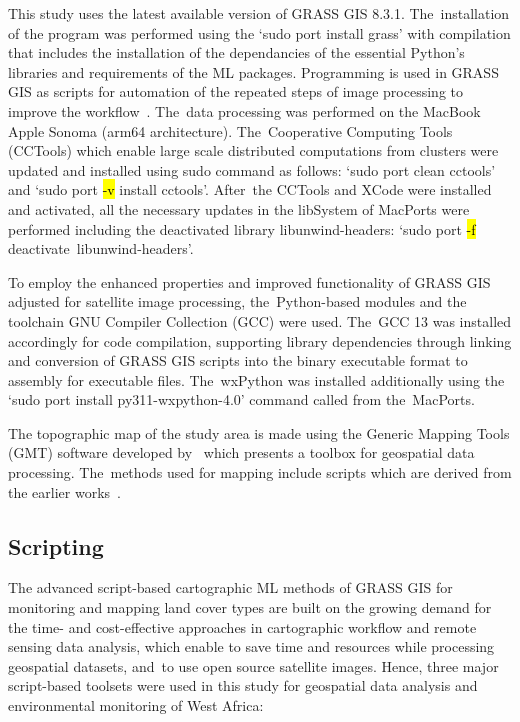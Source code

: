 \documentclass[coasts,article,accept,pdftex,oneauthor]{Definitions/mdpi}
\begin{document}
{This} study {uses} the latest available version of GRASS GIS 8.3.1. The~installation of the program was performed using {the} `sudo port install grass' with compilation {that includes }the {installation of the }dependancies {of} the essential Python's libraries and requirements of {the }ML packages. Programming is used in GRASS GIS as scripts for automation of the repeated steps of image processing {to improve} the workflow~\cite{technologies11020046,jmse11040871}. The~data processing was performed on the MacBook Apple Sonoma (arm64 {architecture}). The~Cooperative Computing Tools (CCTools) which enable large scale distributed computations from clusters were updated and installed using sudo {command} as follows: `sudo port clean cctools' and `sudo port \hl{-v} %
 install cctools'. After~the CCTools and XCode were installed and activated, {all the }necessary updates in the libSystem of MacPorts were performed including the deactivated library libunwind-headers: `sudo port \hl{-f} deactivate~libunwind-headers'. 

To employ the enhanced properties and improved functionality of GRASS GIS adjusted for satellite image processing,   the~Python-based modules and the toolchain GNU Compiler Collection (GCC) {were used}. The~GCC 13 was installed accordingly for code compilation, supporting library dependencies through linking and conversion of GRASS GIS scripts into the binary executable format to assembly for executable files. The~wxPython was installed additionally using the `sudo port install py311-wxpython-4.0' {command called} from the~MacPorts. 

The topographic map of the study area is made using the Generic Mapping Tools (GMT) software developed by~\cite{Wessel} {which presents a toolbox for geospatial data processing}. The~methods used for mapping {include} scripts {which }are derived from the earlier works~\cite{Lemenkova202217,Lemenkova202212,Lemenkova202203}. 

\subsection{Scripting}
The advanced script-based cartographic ML methods of GRASS GIS for monitoring and mapping land cover types are built on the growing demand for the time- and cost-effective approaches in cartographic workflow and remote sensing data analysis, which enable to save time and resources while processing geospatial datasets, and~{to }use open source satellite images. Hence, three major script-based toolsets were used in this study for geospatial data analysis and environmental monitoring of West Africa:
\end{document}
